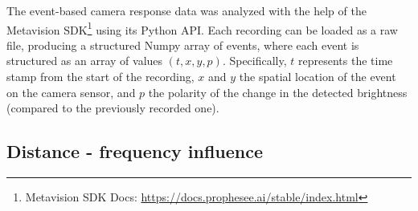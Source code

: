 The event-based camera response data was analyzed with the help of the Metavision SDK\footnote{Metavision SDK Docs: \url{https://docs.prophesee.ai/stable/index.html}}
using its Python API. Each recording can be loaded as a raw file, producing a structured Numpy array of events, where each event is structured as an array of values
$(t, x, y, p)$. Specifically, $t$ represents the time stamp from the start of the recording, $x$ and $y$ the spatial location of the event
on the camera sensor, and $p$ the polarity of the change in the detected brightness (compared to the previously recorded one).

\subsection{Distance - frequency influence}

